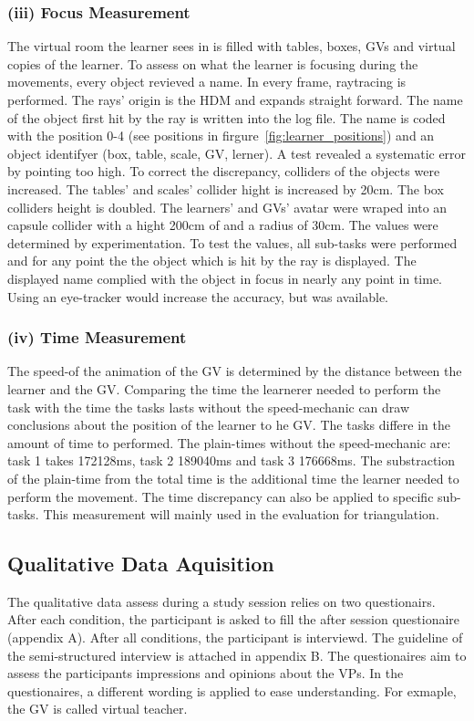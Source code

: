 \subsubsection{(iii) Focus Measurement}
The virtual room the learner sees in \exgo is filled with tables, boxes, GVs and virtual copies of the learner. To assess on what the learner is focusing during the movements, every object revieved a name. In every frame, raytracing is performed. The rays' origin is the HDM and expands straight forward. The name of the object first hit by the ray is written into the log file. The name is coded with the position 0-4 (see positions in firgure~\ref{fig:learner_positions}) and an object identifyer (box, table, scale, GV, lerner). A test revealed a systematic error by pointing too high. To correct the discrepancy, colliders of the objects were increased. The tables' and scales' collider hight is increased by 20cm. The box colliders height is doubled. The learners' and GVs' avatar were wraped into an capsule collider with a hight 200cm of and a radius of 30cm. The values were determined by experimentation. To test the values, all sub-tasks were performed and for any point the the object which is hit by the ray is displayed. The displayed name complied with the object in focus in nearly any point in time. Using an eye-tracker would increase the accuracy, but was available.

\subsubsection{(iv) Time Measurement}
The speed-of the animation of the GV is determined by the distance between the learner and the GV. Comparing the time the learnerer needed to perform the task with the time the tasks lasts without the speed-mechanic can draw conclusions about the position of the learner to he GV. The tasks differe in the amount of time to performed. The plain-times without the speed-mechanic are: task 1 takes 172128ms, task 2 189040ms and task 3 176668ms. The substraction of the plain-time from the total time is the additional time the learner needed to perform the movement. The time discrepancy can also be applied to specific sub-tasks. This measurement will mainly used in the evaluation for triangulation. 

\subsection{Qualitative Data Aquisition}
\label{sec:quali_logging}
The qualitative data assess during a study session relies on two questionairs. After each condition, the participant is asked to fill the after session questionaire (appendix A). After all conditions, the participant is interviewd. The guideline of the semi-structured interview is attached in appendix B. The questionaires aim to assess the participants impressions and opinions about the VPs. In the questionaires, a different wording is applied to ease understanding. For exmaple, the GV is called virtual teacher. 

